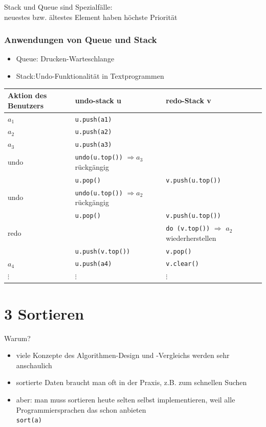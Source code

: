 \documentclass[11pt, fleqn]{scrreprt}
\begin{document}
        Stack und Queue sind Spezialfälle: \\
        neuestes bzw. ältestes Element haben höchste Priorität \\


        \subsection*{Anwendungen von Queue und Stack}
        \begin{itemize}
            \item Queue: Drucken-Warteschlange
            \item Stack:Undo-Funktionalität in Textprogrammen
        \end{itemize}

        \begin{tabular}{C{5cm} | C{5cm} | C{5cm}}
            Aktion des Benutzers & undo-stack u & redo-Stack v \\ \hline
            $a_1$ & \verb|u.push(a1)| & \\
            $a_2$ & \verb|u.push(a2)| & \\
            $a_3$ & \verb|u.push(a3)| & \\ \hline
            undo & \verb|undo(u.top())| $\Rightarrow a_3$ rückgängig & \\
            & \verb|u.pop()| & \verb|v.push(u.top())|\\ \hline
            undo & \verb|undo(u.top())| $\Rightarrow a_2$ rückgängig & \\
            & \verb|u.pop()| & \verb|v.push(u.top())|\\ \hline
            redo & & \verb|do (v.top())| $\Rightarrow$ $a_2$ wiederherstellen \\
            & \verb|u.push(v.top())| & \verb|v.pop()| \\ \hline
            $a_4$ & \verb|u.push(a4)| & \verb|v.clear()| \\
            $\vdots$ & $\vdots$ & $\vdots$ \\
        \end{tabular}


        \chapter*{3 Sortieren}

        Warum?
        \begin{itemize}
            \item viele Konzepte des Algorithmen-Design und -Vergleichs werden sehr anschaulich
            \item sortierte Daten braucht man oft in der Praxis, z.B. zum schnellen Suchen
            \item aber: man muss sortieren heute selten selbst implementieren, weil alle Programmiersprachen das schon anbieten \\
            \hspace*{1cm} \verb|sort(a)|
        \end{itemize}
\end{document}
